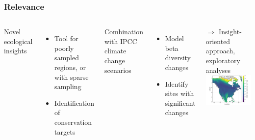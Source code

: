 \documentclass[10pt, aspectratio=1610]{beamer}
\begin{document}
\begin{frame}
  \frametitle{Relevance}
  \begin{columns}
    \hspace*{-0cm}
      Novel ecological insights
      \begin{itemize}
        \item Tool for poorly sampled regions, or with sparse sampling
        \item Identification of conservation targets
      \end{itemize}
      \vspace{0.5cm}
      Combination with IPCC climate change scenarios
      \begin{itemize}
        \item Model beta diversity changes
        \item Identify sites with significant changes
      \end{itemize}
      \vspace{0.5cm}
      $\Rightarrow$ Insight-oriented approach, exploratory analyses
    \hspace*{-1cm}
      \includegraphics[scale=0.12]{fig/05_sdm_lcbd.png}
  \end{columns}
\end{frame}
\end{document}
